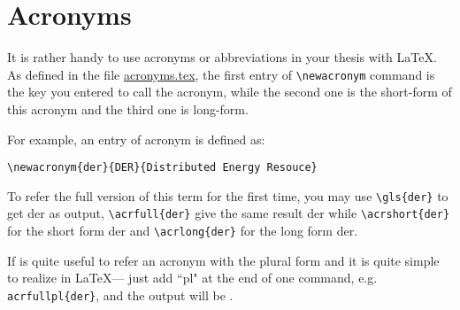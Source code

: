 \chapter{Acronyms}

It is rather handy to use acronyms or abbreviations in your thesis with \LaTeX. As defined in the file \href{acronyms/acronyms.tex}{acronyms.tex}, the first entry of {\verb|\newacronym|} command is the key you entered to call the acronym, while the second one is the short-form of this acronym and the third one is long-form.

For example, an entry of acronym is defined as:

{\verb|\newacronym{der}{DER}{Distributed Energy Resouce}|}

To refer the full version of this term for the first time, you may use {\verb|\gls{der}|} to get \gls{der} as output, {\verb|\acrfull{der}|} give the same result \acrfull{der} while {\verb|\acrshort{der}|} for the short form \acrshort{der} and {\verb|\acrlong{der}|} for the long form \acrlong{der}.

If is quite useful to refer an acronym with the plural form and it is quite simple to realize in \LaTeX --- just add ``pl" at the end of one command, e.g. {\verb|acrfullpl{der}|}, and the output will be .